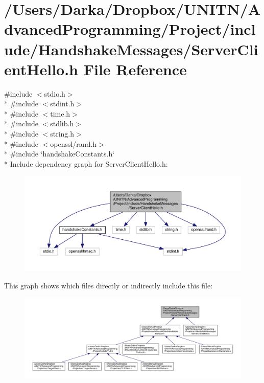 \section{/\+Users/\+Darka/\+Dropbox/\+U\+N\+I\+T\+N/\+Advanced\+Programming/\+Project/include/\+Handshake\+Messages/\+Server\+Client\+Hello.h File Reference}
\label{_server_client_hello_8h}
{\ttfamily \#include $<$stdio.\+h$>$}\\*
{\ttfamily \#include $<$stdint.\+h$>$}\\*
{\ttfamily \#include $<$time.\+h$>$}\\*
{\ttfamily \#include $<$stdlib.\+h$>$}\\*
{\ttfamily \#include $<$string.\+h$>$}\\*
{\ttfamily \#include $<$openssl/rand.\+h$>$}\\*
{\ttfamily \#include \char`\"{}handshake\+Constants.\+h\char`\"{}}\\*
Include dependency graph for Server\+Client\+Hello.\+h\+:\nopagebreak
\begin{figure}[H]
\begin{center}
\leavevmode
\includegraphics[width=350pt]{_server_client_hello_8h__incl}
\end{center}
\end{figure}
This graph shows which files directly or indirectly include this file\+:\nopagebreak
\begin{figure}[H]
\begin{center}
\leavevmode
\includegraphics[width=350pt]{_server_client_hello_8h__dep__incl}
\end{center}
\end{figure}
